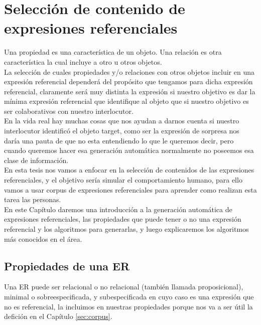 \chapter{Selecci\'on de contenido de expresiones referenciales}
\label{sec:seleccion}

Una propiedad es una caracter\'istica de un objeto. Una relaci\'on es otra caracter\'istica la cual incluye a otro u otros objetos.\\

La selecci\'on de cuales propiedades y/o relaciones con otros objetos incluir en una expresi\'on referencial depender\'a del prop\'osito que tengamos para dicha expresi\'on referencial, claramente ser\'a muy distinta la expresi\'on si nuestro objetivo es dar la m\'inima expresi\'on referencial que identifique al objeto que si nuestro objetivo es ser colaborativos con nuestro interlocutor.\\

En la vida real hay muchas cosas que nos ayudan a darnos cuenta si nuestro interlocutor identific\'o el objeto target, como ser la expresi\'on de sorpresa nos dar\'ia una pauta de que no esta entendiendo lo que le queremos decir, pero cuando queremos hacer esa generaci\'on autom\'atica normalmente no poseemos esa clase de informaci\'on.\\

En esta tesis nos vamos a enfocar en la selecci\'on de contenidos de las expresiones referenciales, y el objetivo ser\'ia simular el comportamiento humano, para ello vamos a usar corpus de expresiones referenciales para aprender como realizan esta tarea las personas.\\

En este Cap\'itulo daremos una introducci\'on a la generaci\'on autom\'atica de expresiones referenciales, las propiedades que puede tener o no una expresi\'on referencial y los algoritmos para generarlas, y luego explicaremos los algoritmos m\'as conocidos en el \'area.


\section{Propiedades de una ER}

Una ER puede ser relacional o no relacional (tambi\'en llamada proposicional), minimal o sobreespecificada, y subespecificada en cuyo caso es una expresi\'on que no es referencial, la incluimos en nuestras propiedades porque nos va a ser \'util la defici\'on en el Cap\'itulo \ref{sec:corpus}.\\

